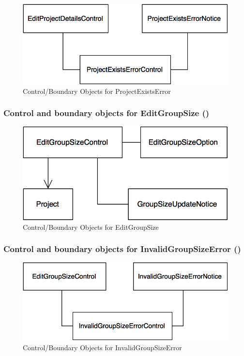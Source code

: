 \documentclass[12pt,letterpaper]{article}
\begin{document}
\begin{figure}[H]
	\centering{}
	\includegraphics[scale=0.4]{imgs/cbod/project-exists-error.png}
	\caption{Control/Boundary Objects for ProjectExistsError}    
\end{figure}

\subsubsection*{Control and boundary objects for EditGroupSize (\editgroupsize{})}

\begin{figure}[H]
	\centering{}
	\includegraphics[scale=0.4]{imgs/cbod/edit-group-size.png}
	\caption{Control/Boundary Objects for EditGroupSize}
\end{figure}

\subsubsection*{Control and boundary objects for InvalidGroupSizeError (\invalidgroupsizeerror{})}

\begin{figure}[H]
	\centering{}
	\includegraphics[scale=0.4]{imgs/cbod/invalid-group-size-error.png}
	\caption{Control/Boundary Objects for InvalidGroupSizeError}
\end{figure}
\end{document}

